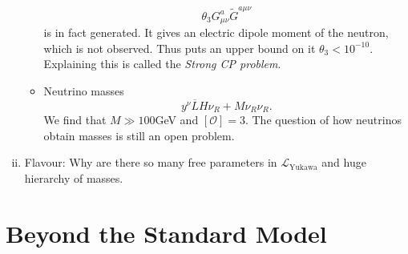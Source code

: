 \begin{enumerate}[(i)]
\begin{itemize}
	\begin{equation}
	  \theta_3 G^{a}_{\mu\nu} \widetilde{G}^{a \mu \nu}
	\end{equation}
	is in fact generated. It gives an electric dipole moment of the neutron, which is not observed. Thus puts an upper bound on it $\theta_3 < 10^{-10}$. Explaining this is called the \emph{Strong CP problem}.
      \item Neutrino masses
	\begin{equation}
	  y^{\nu} \overline{L}{} H \nu_R + M \nu_R \nu_R.
	\end{equation}
	We find that $M \gg 100$GeV and $[\mathcal{O}] = 3$. The question of how neutrinos obtain masses is still an open problem.
    \end{itemize}
  \item Flavour: Why are there so many free parameters in $\mathscr{L}_{\text{Yukawa}}$ and huge hierarchy of masses.
\end{enumerate}

\section{Beyond the Standard Model}%
\label{sec:beyond_the_standard_model}

